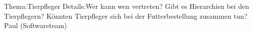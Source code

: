 
%
	{Thema:}{Tierpfleger}%
	{Details:}{Wer kann wen vertreten? \newline Gibt es Hierarchien bei den Tierpflegern? \newline Könnten Tierpfleger sich bei der Futter\-bestellung zusammen tun?}%
	{Paul (Softwareteam)}
